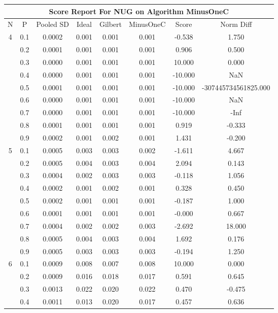 \documentclass[11pt,a4paper]{report}
\begin{document}
\begin{longtable}{ | c | c || c | c | c | c | c | c | }
\hline
\multicolumn{8}{|c|}{ Score Report For NUG on Algorithm MinusOneC} \\
\hline
N & P & Pooled SD &  Ideal &  Gilbert & MinusOneC  & Score & Norm Diff \\
 \hline
 \hline
 \endhead
\multirow{9}{*}{4} & 0.1 & 0.0002 & 0.001 & 0.001 & 0.001 & -0.538 & 1.750 \\
 & 0.2 & 0.0001 & 0.001 & 0.001 & 0.001 & 0.906 & 0.500 \\
 & 0.3 & 0.0000 & 0.001 & 0.001 & 0.001 & 10.000 & 0.000 \\
 & 0.4 & 0.0000 & 0.001 & 0.001 & 0.001 & -10.000 & NaN \\
 & 0.5 & 0.0001 & 0.001 & 0.001 & 0.001 & -10.000 & -307445734561825.000 \\
 & 0.6 & 0.0000 & 0.001 & 0.001 & 0.001 & -10.000 & NaN \\
 & 0.7 & 0.0000 & 0.001 & 0.001 & 0.001 & -10.000 & -Inf \\
 & 0.8 & 0.0001 & 0.001 & 0.001 & 0.001 & 0.919 & -0.333 \\
 & 0.9 & 0.0002 & 0.001 & 0.002 & 0.001 & 1.431 & -0.200 \\
 \hline
\multirow{9}{*}{5} & 0.1 & 0.0005 & 0.003 & 0.003 & 0.002 & -1.611 & 4.667 \\
 & 0.2 & 0.0005 & 0.004 & 0.003 & 0.004 & 2.094 & 0.143 \\
 & 0.3 & 0.0004 & 0.002 & 0.003 & 0.003 & -0.118 & 1.056 \\
 & 0.4 & 0.0002 & 0.001 & 0.002 & 0.001 & 0.328 & 0.450 \\
 & 0.5 & 0.0002 & 0.001 & 0.001 & 0.001 & -0.187 & 1.000 \\
 & 0.6 & 0.0001 & 0.001 & 0.001 & 0.001 & -0.000 & 0.667 \\
 & 0.7 & 0.0004 & 0.002 & 0.002 & 0.003 & -2.692 & 18.000 \\
 & 0.8 & 0.0005 & 0.004 & 0.003 & 0.004 & 1.692 & 0.176 \\
 & 0.9 & 0.0005 & 0.003 & 0.003 & 0.003 & -0.194 & 1.250 \\
 \hline
\multirow{9}{*}{6} & 0.1 & 0.0009 & 0.008 & 0.007 & 0.008 & 10.000 & 0.000 \\
 & 0.2 & 0.0009 & 0.016 & 0.018 & 0.017 & 0.591 & 0.645 \\
 & 0.3 & 0.0013 & 0.022 & 0.020 & 0.022 & 0.470 & -0.475 \\
 & 0.4 & 0.0011 & 0.013 & 0.020 & 0.017 & 0.457 & 0.636 \\

\end{longtable}
\end{document}
